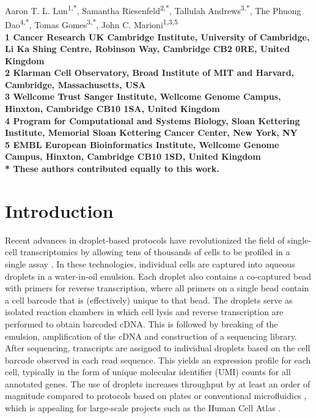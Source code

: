 \documentclass[10pt,letterpaper]{article}
\begin{document}
\vspace*{0.35in}

\begin{flushleft}
{\Large
    \textbf{}
}
\newline

Aaron T. L. Lun\textsuperscript{1,*},
Samantha Riesenfeld\textsuperscript{2,*},
Tallulah Andrews\textsuperscript{3,*},
The Phuong Dao\textsuperscript{4,*},
Tomas Gomes\textsuperscript{3,*},
John C. Marioni\textsuperscript{1,3,5}
\\
\bigskip
\bf{1} Cancer Research UK Cambridge Institute, University of Cambridge, Li Ka Shing Centre, Robinson Way, Cambridge CB2 0RE, United Kingdom \\
\bf{2} Klarman Cell Observatory, Broad Institute of MIT and Harvard, Cambridge, Massachusetts, USA \\
\bf{3} Wellcome Trust Sanger Institute, Wellcome Genome Campus, Hinxton, Cambridge CB10 1SA, United Kingdom \\
\bf{4} Program for Computational and Systems Biology, Sloan Kettering Institute, Memorial Sloan Kettering Cancer Center, New York, NY \\
\bf{5} EMBL European Bioinformatics Institute, Wellcome Genome Campus, Hinxton, Cambridge CB10 1SD, United Kingdom
\\
\bigskip
* These authors contributed equally to this work.

\end{flushleft}

\section*{Introduction}
Recent advances in droplet-based protocols have revolutionized the field of single-cell transcriptomics by allowing tens of thousands of cells to be profiled in a single assay \cite{macosko2015highly,klein2015droplet,zheng2017massively}.
In these technologies, individual cells are captured into aqueous droplets in a water-in-oil emulsion.
Each droplet also contains a co-captured bead with primers for reverse transcription, where all primers on a single bead contain a cell barcode that is (effectively) unique to that bead.
The droplets serve as isolated reaction chambers in which cell lysis and reverse transcription are performed to obtain barcoded cDNA.
This is followed by breaking of the emulsion, amplification of the cDNA and construction of a sequencing library.
After sequencing, transcripts are assigned to individual droplets based on the cell barcode observed in each read sequence.
This yields an expression profile for each cell, typically in the form of unique molecular identifier (UMI) counts \cite{islam2014quantitative} for all annotated genes. 
The use of droplets increases throughput by at least an order of magnitude compared to protocols based on plates \cite{picelli2013smartseq2} or conventional microfluidics \cite{pollen2014low}, which is appealing for large-scale projects such as the Human Cell Atlas \cite{regev2017human}.
\end{document}
